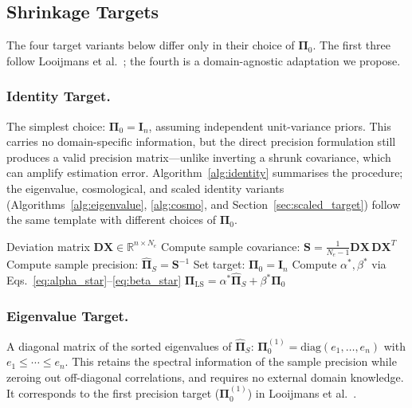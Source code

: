 \subsection{Shrinkage Targets}
\label{sec:targets}

The four target variants below differ only in their choice of $\boldsymbol{\Pi}_0$. The first three follow Looijmans et al.~\cite{looijmans2024comparison}; the fourth is a domain-agnostic adaptation we propose.

\subsubsection{Identity Target.}

The simplest choice: $\boldsymbol{\Pi}_0 = \mathbf{I}_n$, assuming independent unit-variance priors. This carries no domain-specific information, but the direct precision formulation still produces a valid precision matrix---unlike inverting a shrunk covariance, which can amplify estimation error. Algorithm~\ref{alg:identity} summarises the procedure; the eigenvalue, cosmological, and scaled identity variants (Algorithms~\ref{alg:eigenvalue}, \ref{alg:cosmo}, and Section~\ref{sec:scaled_target}) follow the same template with different choices of $\boldsymbol{\Pi}_0$.

\begin{algorithm}[t]
\caption{Direct Precision Shrinkage (Identity Target)}
\label{alg:identity}
\begin{algorithmic}[1]
\REQUIRE Deviation matrix $\mathbf{DX} \in \mathbb{R}^{n \times N_e}$
\STATE Compute sample covariance: $\mathbf{S} = \frac{1}{N_e-1} \mathbf{DX} \, \mathbf{DX}^T$
\STATE Compute sample precision: $\hat{\boldsymbol{\Pi}}_S = \mathbf{S}^{-1}$
\STATE Set target: $\boldsymbol{\Pi}_0 = \mathbf{I}_n$
\STATE Compute $\alpha^*, \beta^*$ via Eqs.~\eqref{eq:alpha_star}--\eqref{eq:beta_star}
\RETURN $\boldsymbol{\Pi}_{\text{LS}} = \alpha^* \hat{\boldsymbol{\Pi}}_S + \beta^* \boldsymbol{\Pi}_0$
\end{algorithmic}
\end{algorithm}

\subsubsection{Eigenvalue Target.}

A diagonal matrix of the sorted eigenvalues of $\hat{\boldsymbol{\Pi}}_S$: $\boldsymbol{\Pi}_0^{(1)} = \text{diag}(e_1, \ldots, e_n)$ with $e_1 \leq \cdots \leq e_n$. This retains the spectral information of the sample precision while zeroing out off-diagonal correlations, and requires no external domain knowledge. It corresponds to the first precision target ($\boldsymbol{\Pi}_0^{(1)}$) in Looijmans et al.~\cite{looijmans2024comparison}.

